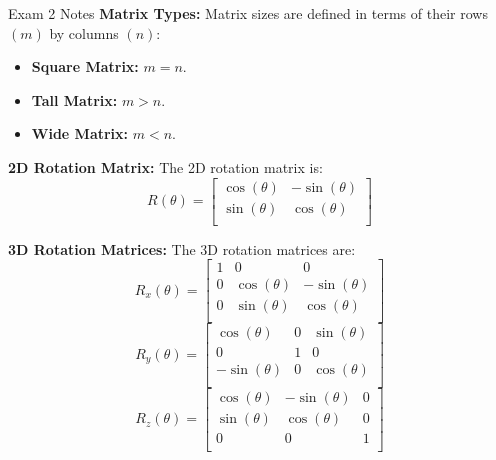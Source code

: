 \begin{examnotes}{Exam 2 Notes}
    \textbf{Matrix Types:} Matrix sizes are defined in terms of their rows $(m)$ by columns $(n)$:
    \begin{itemize}
        \item \textbf{Square Matrix:} $m = n$.
        \item \textbf{Tall Matrix:} $m > n$.
        \item \textbf{Wide Matrix:} $m < n$.
    \end{itemize}

    \textbf{2D Rotation Matrix:} The 2D rotation matrix is:
    \begin{equation*}
        R(\theta) = 
        \begin{bmatrix}
            \cos{(\theta)} & -\sin{(\theta)} \\
            \sin{(\theta)} & \cos{(\theta)} \\
        \end{bmatrix}
    \end{equation*}

    \textbf{3D Rotation Matrices:} The 3D rotation matrices are:
    \begin{equation*}
        R_{x}(\theta) = 
        \begin{bmatrix}
            1 & 0 & 0 \\
            0 & \cos{(\theta)} & -\sin{(\theta)} \\
            0 & \sin{(\theta)} & \cos{(\theta)} \\
        \end{bmatrix}
    \end{equation*}
    \begin{equation*}
        R_{y}(\theta) = 
        \begin{bmatrix}
            \cos{(\theta)} & 0 & \sin{(\theta)} \\
            0 & 1 & 0 \\
            -\sin{(\theta)} & 0 & \cos{(\theta)} \\
        \end{bmatrix}
    \end{equation*}
    \begin{equation*}
        R_{z}(\theta) = 
        \begin{bmatrix}
            \cos{(\theta)} & -\sin{(\theta)} & 0 \\
            \sin{(\theta)} & \cos{(\theta)} & 0 \\
            0 & 0 & 1 \\
        \end{bmatrix}
    \end{equation*}


\end{examnotes}
